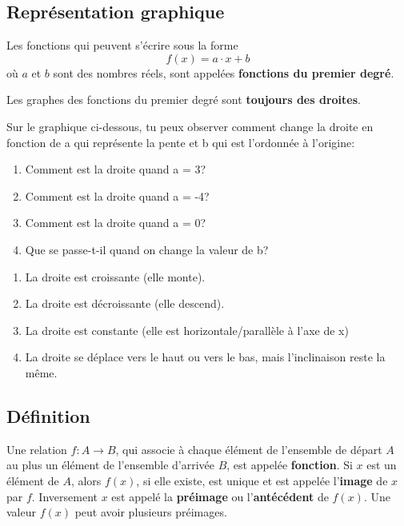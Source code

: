 \documentclass[a4paper,11pt]{article}
\begin{document}
\subsection{Représentation graphique}
Les fonctions qui peuvent s'écrire sous la forme
$$f(x)=a\cdot x +b$$
où $a$ et $b$ sont des nombres réels, sont appelées \textbf{fonctions du premier degré}.

Les graphes des fonctions du premier degré sont \textbf{toujours des droites}.

Sur le graphique ci-dessous, tu peux observer comment change la droite en fonction de a qui représente la pente et b qui est l'ordonnée à l'origine:\par
\begin{enumerate}
    \item Comment est la droite quand a = 3?
    \item Comment est la droite quand a = -4?
    \item Comment est la droite quand a = 0?
    \item Que se passe-t-il quand on change la valeur de b?
\end{enumerate}

\begin{solution}
\begin{enumerate}
    \item La droite est croissante (elle monte).
    \item La droite est décroissante (elle descend).
    \item La droite est constante (elle est horizontale/parallèle à l'axe de x)
    \item La droite se déplace vers le haut ou vers le bas, mais l'inclinaison reste la même.
\end{enumerate}
\end{solution}

\subsection{Définition}
Une relation $f: A \longrightarrow B$, qui associe à chaque élément de l'ensemble de départ $A$ au plus un élément de l'ensemble d'arrivée $B$, est appelée \textbf{fonction}.
Si $x$ est un élément de $A$, alors $f(x)$, si elle existe, est unique et est appelée l'\textbf{image} de $x$ par $f$.
Inversement $x$ est appelé la \textbf{préimage} ou l'\textbf{antécédent} de $f(x)$.
Une valeur $f(x)$ peut avoir plusieurs préimages.
\end{document}
